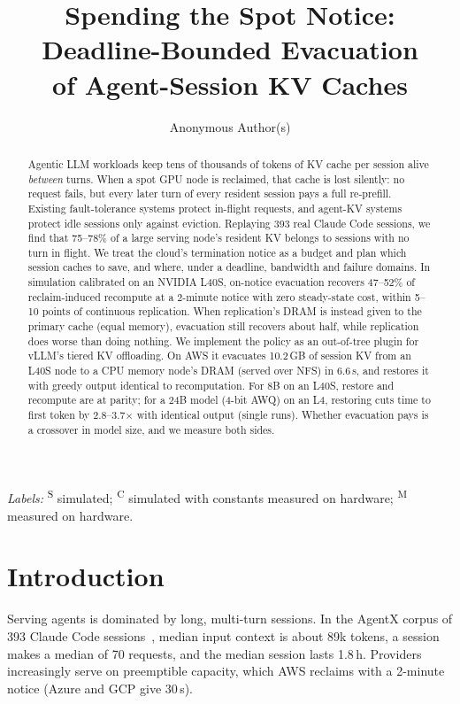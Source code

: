\documentclass[10pt,twocolumn]{article}
\title{Spending the Spot Notice: Deadline-Bounded Evacuation\\of Agent-Session KV Caches}
\author{Anonymous Author(s)}
\date{}
\newcommand{\Sim}{\textsuperscript{S}}
\newcommand{\Cal}{\textsuperscript{C}}
\newcommand{\Meas}{\textsuperscript{M}}
\begin{document}
\maketitle

\begin{abstract}
Agentic LLM workloads keep tens of thousands of tokens of KV cache per session alive
\emph{between} turns. When a spot GPU node is reclaimed, that cache is lost silently:
no request fails, but every later turn of every resident session pays a full
re-prefill. Existing fault-tolerance systems protect in-flight requests, and agent-KV
systems protect idle sessions only against eviction. Replaying 393 real Claude Code
sessions, we find that 75--78\% of a large serving node's resident KV belongs to
sessions with no turn in flight. We treat the cloud's termination notice as a budget
and plan which session caches to save, and where, under a deadline, bandwidth and
failure domains. In simulation calibrated on an NVIDIA L40S, on-notice evacuation
recovers 47--52\% of reclaim-induced recompute at a 2-minute notice with zero
steady-state cost, within 5--10 points of continuous replication. When replication's
DRAM is instead given to the primary cache (equal memory), evacuation still recovers
about half, while replication does worse than doing nothing. We implement the policy
as an out-of-tree plugin for vLLM's tiered KV offloading. On AWS it evacuates 10.2\,GB
of session KV from an L40S node to a CPU memory node's DRAM (served over NFS) in
6.6\,s, and restores it with greedy output identical to recomputation. For 8B on an
L40S, restore and recompute are at parity; for a 24B model (4-bit AWQ) on an L4,
restoring cuts time to first token by 2.8--3.7$\times$ with identical output (single
runs). Whether evacuation pays is a crossover in model size, and we measure both sides.
\end{abstract}

\noindent\emph{Labels:} \Sim{} simulated; \Cal{} simulated with constants measured on
hardware; \Meas{} measured on hardware.

\section{Introduction}
Serving agents is dominated by long, multi-turn sessions. In the AgentX corpus of 393
Claude Code sessions~\cite{agentx}, median input context is about 89k tokens, a
session makes a median of 70 requests, and the median session lasts 1.8\,h.
Providers increasingly serve on preemptible capacity, which AWS reclaims with a
2-minute notice (Azure and GCP give 30\,s).
\end{document}
